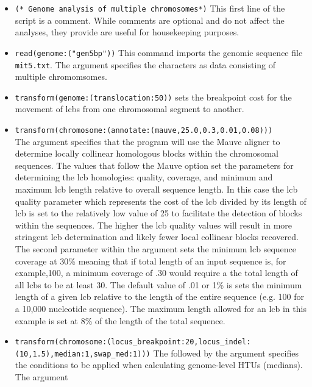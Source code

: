 \begin{itemize}
\item \texttt{(* Genome analysis of multiple chromosomes*)} This first line of the script is a comment. While 
comments are optional and do not affect the analyses, they provide are useful for housekeeping purposes.
\item \texttt{read(genome:("gen5bp"))} This command imports the genomic sequence file \texttt{mit5.txt}. The 
argument  specifies the characters as data consisting of multiple chromomsomes.
\item \texttt{transform(genome:(translocation:50))} sets the breakpoint cost for the movement of lcbs from one 
chromosomal segment to another. 
\item \texttt{transform(chromosome:(annotate:(mauve,25.0,0.3,0.01,0.08)))} \\The argument  specifies that the program will use the Mauve aligner \cite{darlingetal2004} to determine locally collinear 
homologous blocks within the chromosomal sequences.  The values that follow the Mauve option set the parameters 
for determining the lcb homologies: quality, coverage, and minimum and maximum lcb length relative to overall 
sequence length. In this case the lcb quality parameter which represents the cost of the lcb divided by its length of lcb
 is set to the relatively low value of 25 to facilitate the detection of blocks within the sequences.  The higher the lcb 
 quality values will result in more stringent lcb determination and likely fewer local collinear blocks recovered.  The 
 second parameter within the argument  sets the minimum lcb sequence coverage 
 at  30\% meaning that if total length of an input sequence is, for example,100, a minimum coverage of .30 would 
 require  a the total length of all lcbs to be at least 30. The default value of .01 or 1\% is sets the minimum length of a 
 given lcb  relative to the length of the entire sequence (e.g. 100 for a 10,000 nucleotide sequence). The maximum 
 length  allowed for an lcb in this example is set at 8\% of the length of the total sequence.
\item \texttt{transform(chromosome:(locus\_breakpoint:20,locus\_indel:\\(10,1.5),median:1,swap\_med:1)))}  The 
 followed by the argument  specifies the conditions to be 
applied when calculating genome-level HTUs (medians). The argument  

\end{itemize}

